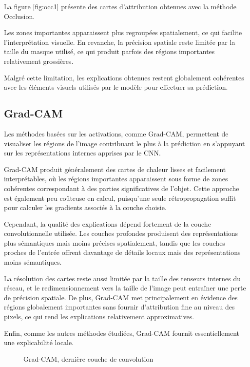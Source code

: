 \documentclass{ir}
\begin{document}
La figure \ref{fig:occ1} présente des cartes d'attribution obtenues avec la méthode Occlusion.

Les zones importantes apparaissent plus regroupées spatialement, ce qui facilite l'interprétation visuelle.
En revanche, la précision spatiale reste limitée par la taille du masque utilisé, ce qui produit parfois des régions importantes relativement grossières.

Malgré cette limitation, les explications obtenues restent globalement cohérentes avec les éléments visuels utilisés par le modèle pour effectuer sa prédiction.

\subsection{Grad-CAM}

Les méthodes basées sur les activations, comme Grad-CAM, permettent de visualiser les régions de l'image contribuant le plus à la prédiction en s'appuyant sur les représentations internes apprises par le CNN.

Grad-CAM produit généralement des cartes de chaleur lisses et facilement interprétables, où les régions importantes apparaissent sous forme de zones cohérentes correspondant à des parties significatives de l'objet.
Cette approche est également peu coûteuse en calcul, puisqu'une seule rétropropagation suffit pour calculer les gradients associés à la couche choisie.

Cependant, la qualité des explications dépend fortement de la couche convolutionnelle utilisée.
Les couches profondes produisent des représentations plus sémantiques mais moins précises spatialement, tandis que les couches proches de l'entrée offrent davantage de détails locaux mais des représentations moins sémantiques.

La résolution des cartes reste aussi limitée par la taille des tenseurs internes du réseau, et le redimensionnement vers la taille de l'image peut entraîner une perte de précision spatiale.
De plus, Grad-CAM met principalement en évidence des régions globalement importantes sans fournir d'attribution fine au niveau des pixels, ce qui rend les explications relativement approximatives.

Enfin, comme les autres méthodes étudiées, Grad-CAM fournit essentiellement une explicabilité locale.

\begin{figure}
    \caption{Grad-CAM, dernière couche de convolution}
    \label{fig:gc1}
\end{figure}
\end{document}
